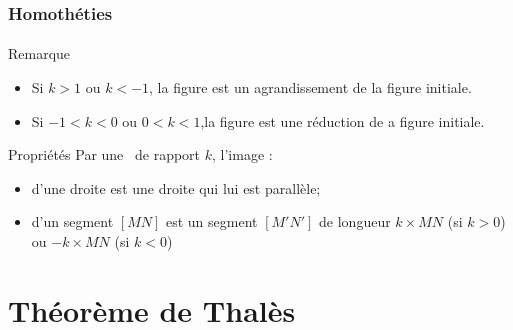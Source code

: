 \documentclass[xcolor={dvipsnames}]{beamer}
\begin{document}
\begin{frame}
	\frametitle{Homothéties}
	\framesubtitle{}
	
	\begin{block}{Remarque}
		\begin{itemize}
			\item Si $k>1$ ou $k<-1$, \pause la figure est un agrandissement de la figure initiale.\pause
			\item Si $-1<k<0$ ou $0<k<1$,\pause la figure est une réduction de a figure initiale. 
		\end{itemize}
	\end{block}
	
	\begin{block}{Propriétés}
		Par une \homo\ de rapport $k$, l'image :
		\begin{itemize}
			\item d'une droite est une droite qui lui est parallèle;
			\item d'un segment $[MN]$ est un segment $[M'N']$ de longueur $k \times MN$ (si $k>0$) ou $-k \times MN$ (si $k<0$)
		\end{itemize}
	\end{block}
\end{frame}

\section{Théorème de Thalès}
\end{document}

